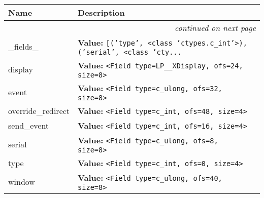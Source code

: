     \vspace{-1cm}
\hspace{\varindent}\begin{longtable}{|p{\varnamewidth}|p{\vardescrwidth}|l}
\cline{1-2}
\cline{1-2} \centering \textbf{Name} & \centering \textbf{Description}& \\
\cline{1-2}
\endhead\cline{1-2}\multicolumn{3}{r}{\small\textit{continued on next page}}\\\endfoot\cline{1-2}
\endlastfoot\raggedright \_\-f\-i\-e\-l\-d\-s\-\_\- & \raggedright \textbf{Value:} 
{\tt \texttt{[}\texttt{(}\texttt{'}\texttt{type}\texttt{'}\texttt{, }{\textless}class 'ctypes.c\_int'{\textgreater}\texttt{)}\texttt{, }\texttt{(}\texttt{'}\texttt{serial}\texttt{'}\texttt{, }{\textless}class 'cty\texttt{...}}&\\
\cline{1-2}
\raggedright d\-i\-s\-p\-l\-a\-y\- & \raggedright \textbf{Value:} 
{\tt {\textless}Field type=LP\_\_XDisplay, ofs=24, size=8{\textgreater}}&\\
\cline{1-2}
\raggedright e\-v\-e\-n\-t\- & \raggedright \textbf{Value:} 
{\tt {\textless}Field type=c\_ulong, ofs=32, size=8{\textgreater}}&\\
\cline{1-2}
\raggedright o\-v\-e\-r\-r\-i\-d\-e\-\_\-r\-e\-d\-i\-r\-e\-c\-t\- & \raggedright \textbf{Value:} 
{\tt {\textless}Field type=c\_int, ofs=48, size=4{\textgreater}}&\\
\cline{1-2}
\raggedright s\-e\-n\-d\-\_\-e\-v\-e\-n\-t\- & \raggedright \textbf{Value:} 
{\tt {\textless}Field type=c\_int, ofs=16, size=4{\textgreater}}&\\
\cline{1-2}
\raggedright s\-e\-r\-i\-a\-l\- & \raggedright \textbf{Value:} 
{\tt {\textless}Field type=c\_ulong, ofs=8, size=8{\textgreater}}&\\
\cline{1-2}
\raggedright t\-y\-p\-e\- & \raggedright \textbf{Value:} 
{\tt {\textless}Field type=c\_int, ofs=0, size=4{\textgreater}}&\\
\cline{1-2}
\raggedright w\-i\-n\-d\-o\-w\- & \raggedright \textbf{Value:} 
{\tt {\textless}Field type=c\_ulong, ofs=40, size=8{\textgreater}}&\\
\cline{1-2}
\end{longtable}



